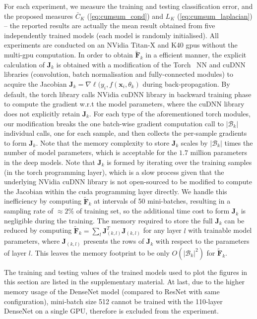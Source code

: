 \documentclass[10pt,journal,compsoc]{IEEEtran}
\begin{document}
For each experiment, we measure the training and testing classification error, and the proposed measures $\bar{C}_K$ (\ref{eq:cumsum_cond}) and $L_K$ (\ref{eq:cumsum_laplacian}) -- the reported results are actually the mean result obtained from five independently trained models (each model is randomly initialised).  All experiments are conducted on an NVidia Titan-X and K40 gpus without the multi-gpu computation. 
In order to obtain $\widetilde{\mathbf{F}}_k$ in a efficient manner, the explicit calculation of $\mathbf{J}_k$ is obtained with a modification of the Torch~\cite{torch7} NN and cuDNN libraries (convolution, batch normalisation and fully-connected modules) to acquire the Jacobian $\mathbf{J}_k = \nabla \ell(y_i,f(\mathbf{x}_i,\theta_k)$ during back-propagation.
By default, the torch library calls NVidia cuDNN library in backward training phase to compute the gradient w.r.t the model parameters, where the cuDNN library does not explicitly retain $\mathbf{J}_k$. 
For each type of the aforementioned torch modules, our modification breaks the one batch-wise gradient computation call to $|\mathcal{B}_k|$ individual calls, one for each sample, and then collects the per-sample gradients to form $\mathbf{J}_k$.
Note that the memory complexity to store $\mathbf{J}_k$ scales by $|\mathcal{B}_k|$ times the number of model parameters, which is acceptable for the $1.7$ million parameters in the deep models.
Note that $\mathbf{J}_k$ is formed by iterating over the training samples (in the torch programming layer), which is a slow process given that the underlying NVidia cuDNN library is not open-sourced to be modified to compute the Jacobian within the cuda programming layer directly.
We handle this inefficiency by computing $\widetilde{\mathbf{F}}_k$ at intervals of 50 mini-batches, resulting in a sampling rate of $\approx 2\%$ of training set, so the additional time cost to form $\mathbf{J}_k$ is negligible during the training.
The memory required to store the full $\mathbf{J}_k$ can be reduced by computing $\widetilde{\mathbf{F}}_k = \sum_l \mathbf{J}_{(k,l)}^T \mathbf{J}_{(k,l)}$ for any layer $l$ with trainable model parameters, where $\mathbf{J}_{(k,l)}$ presents the rows of $\mathbf{J}_k$ with respect to the parameters of layer $l$.
This leaves the memory footprint to be only $O(|\mathcal{B}_k|^2)$ for $\widetilde{\mathbf{F}}_k$. %

The training and testing values of the trained models used to plot the figures in this section are listed in the supplementary material. %
At last, due to the higher memory usage of the DenseNet model (compared to ResNet with same configuration), mini-batch size 512 cannot be trained with the 110-layer DenseNet on a single GPU, therefore is excluded from the experiment.
\end{document}

